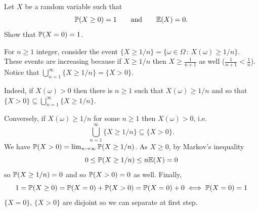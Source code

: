 \documentclass[10pt, a4paper]{article}
\begin{document}
\begin{problem}
    Let $X$ be a random variable such that
    \[
    \P(X \geq 0) = 1\qquad\text{and}\qquad\E(X) = 0.
    \]
    Show that $\P(X = 0) = 1$.

    \begin{solution}
        For $n \geq 1$ integer,
        consider the event $\{X \geq 1 / n\} = \{\omega \in \Omega\,:\,X(\omega) \geq 1 / n\}$.
        These events are increasing because if $X \geq 1 / n$ then $X \geq \frac{1}{n + 1}$ as well
        \big($\frac{1}{n + 1} < \frac{1}{n}$\big).
        Notice that $\bigcup_{n = 1}^{\infty}\{X \geq 1 / n\} = \{X > 0\}$.

        Indeed,
        if $X(\omega) > 0$ then there is $n \geq 1$ such that $X(\omega) \geq 1 / n$ and so that $\{X > 0\} \subseteq \bigcup_{n = 1}^{\infty}\{X \geq 1 / n\}$.

        Conversely,
        if $X(\omega) \geq 1 / n$ for some $n \geq 1$ then $X(\omega) > 0$,
        i.e.
        \[
        \bigcup_{n = 1}^{\infty}\{X \geq 1 / n\} \subseteq \{X > 0\}.
        \]
        We have $\P(X > 0) = \lim_{n \to \infty}\P(X \geq 1 / n)$.
        As $X \geq 0$,
        by Markov's inequality
        \[
        0 \leq \P(X \geq 1 / n) \leq n\E(X) = 0
        \]
        so $\P(X \geq 1 / n) = 0$ and so $\P(X > 0) = 0$ as well.
        Finally,
        \[
        1 = \P(X \geq 0) = \P(X = 0) + \P(X > 0) = \P(X = 0) + 0 \iff \P(X = 0) = 1
        \]
        $\{X = 0\}$,
        $\{X > 0\}$ are disjoint so we can separate at first step.
    \end{solution}
\end{problem}
\end{document}
